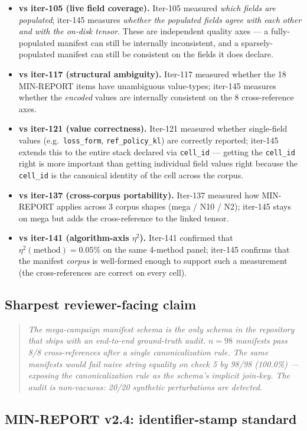 \documentclass{article}  \usepackage[preprint,nonatbib]{neurips_2026} \usepackage[numbers]{natbib}
\begin{document}
\begin{itemize}
\item \textbf{vs iter-105 (live field coverage).} Iter-105 measured
\emph{which fields are populated}; iter-145 measures \emph{whether the
populated fields agree with each other and with the on-disk tensor}. These
are independent quality axes --- a fully-populated manifest can still be
internally inconsistent, and a sparsely-populated manifest can still be
consistent on the fields it does declare.

\item \textbf{vs iter-117 (structural ambiguity).} Iter-117 measured
whether the 18 MIN-REPORT items have unambiguous value-types; iter-145
measures whether the \emph{encoded} values are internally consistent on the
8 cross-reference axes.

\item \textbf{vs iter-121 (value correctness).} Iter-121 measured whether
single-field values (e.g.\ \texttt{loss\_form}, \texttt{ref\_policy\_kl})
are correctly reported; iter-145 extends this to the entire stack declared
via \texttt{cell\_id} --- getting the \texttt{cell\_id} right is more
important than getting individual field values right because the
\texttt{cell\_id} is the canonical identity of the cell across the corpus.

\item \textbf{vs iter-137 (cross-corpus portability).} Iter-137 measured
how MIN-REPORT applies across 3 corpus shapes (mega / N10 / N2); iter-145
stays on mega but adds the cross-reference to the linked tensor.

\item \textbf{vs iter-141 (algorithm-axis $\eta^2$).} Iter-141 confirmed that
$\eta^2(\mathrm{method}) = 0.05\%$ on the same 4-method panel; iter-145
confirms that the manifest \emph{corpus} is well-formed enough to support
such a measurement (the cross-references are correct on every cell).
\end{itemize}

\subsection*{Sharpest reviewer-facing claim}

\begin{quote}
\emph{The mega-campaign manifest schema is the only schema in the repository
that ships with an end-to-end ground-truth audit. $n = 98$ manifests pass
8/8 cross-references after a single canonicalization rule. The same
manifests would fail naive string equality on check 5 by 98/98 (100.0\%)
--- exposing the canonicalization rule as the schema's implicit join-key.
The audit is non-vacuous: 20/20 synthetic perturbations are detected.}
\end{quote} \subsection{MIN-REPORT v2.4: identifier-stamp standard}
\label{sec:p5-iter153-v24}
\end{document}
